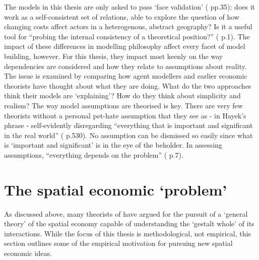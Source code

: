 The models in this thesis are only asked to pass `face validation' (\citealt{oeffner_agent-based_2008} pp.35): does it work as a self-consistent set of relations, able to explore the question of how changing costs affect actors in a heterogenous, abstract geography? Is it a useful tool for ``probing the internal consistency of a theoretical position?'' (\citealt{di_paolo_simulation_2000} p.1). The impact of these differences in modelling philosophy affect every facet of model building, however. For this thesis, they impact most keenly on the way dependencies are considered and how they relate to assumptions about reality. The issue is examined by comparing how agent modellers and earlier economic theorists have thought about what they are doing. What do the two approaches think their models are `explaining'? How do they think about simplicity and realism? The way model assumptions are theorised is key. There are very few theorists without a personal pet-hate assumption that they see as - in Hayek's phrase - self-evidently disregarding ``everything that is important and significant in the real world'' (\citealt{hayek_use_1945} p.530). No assumption can be dismissed so easily since what is `important and significant' is in the eye of the beholder. In assessing assumptions, ``everything depends on the problem'' (\citealt{friedman_essays_1953} p.7).

\section{The spatial economic `problem' \label{sec:problem}}


As discussed above, many theorists of have argued for the pursuit of a `general theory' of the spatial economy capable of understanding the `gestalt whole' of its interactions. While the focus of this thesis is methodological, not empirical, this section outlines some of the empirical motivation for pursuing new spatial economic ideas. 

